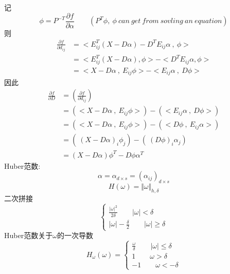 \documentclass[245.0pt]{article}
\begin{document}
记
\begin{equation*}
\phi = P^{-T} \frac{\partial f}{\partial \alpha} \qquad ( P^{T} \phi , \ \phi \ can\ get\ from\ sovling\ an\ equation) \tag{1.7}
\end{equation*}
则
\begin{equation*}
\begin{split}
\frac{\partial f}{\partial d_{ij}} &= < E_{ij}^{T} ( X - D \alpha ) - D^{T} E_{ij} \alpha \ , \ \phi > \\
&= <E^{T}_{ij} ( X - D \alpha ) , \phi > - < D^{T} E_{ij} \alpha , \phi > \\
&= < X - D \alpha \ , \ E_{ij} \phi > - < E_{ij} \alpha \ , \ D \phi >
\end{split} \tag{1.8}
\end{equation*}
因此
\begin{equation*}
\begin{split}
\frac{\partial f}{\partial D} &= (\frac{\partial f}{\partial d_{ij}} ) \\
&= ( < X - D \alpha \ , \ E_{ij} \phi > ) - ( < E_{ij} \alpha \ , \ D \phi > ) \\
&= ( < X - D \alpha \ , \ E_{ij} \phi > ) - ( < D \phi \ , \ E_{ij} \alpha > ) \\
&= ( \ ( X - D \alpha )_{i} \phi_{j} ) - ( \ ( D \phi )_{i} \alpha_{j} ) \\
&= ( X - D \alpha ) \phi^{T} - D \phi \alpha^{T}
\end{split} \tag{1.9}
\end{equation*}
\newpage
Huber范数:
\begin{equation*}
\alpha = \alpha_{d\times s} = (\alpha_{ij})_{d\times s} \tag{2.1}
\end{equation*}
\begin{equation*}
H(\omega) = \Vert\omega\Vert_{h,\delta}\tag{2.2}
\end{equation*}
二次拼接
\begin{equation*}
\begin{cases}
\frac{|\omega|^2}{2\delta}\qquad|\omega|<\delta\\
|\omega| - \frac{\delta}{2}\qquad|\omega|\geq\delta
\end{cases} \tag{2.3}
\end{equation*}
Huber范数关于$\omega$的一次导数
\begin{equation*}
H_{\omega}(\omega) = 
\begin{cases}
\frac{\omega}{\delta} \qquad |\omega| \leq \delta\\
1 \qquad \omega>\delta\\
-1 \qquad \omega<-\delta
\end{cases} \tag{2.4}
\end{equation*}
\end{document}
